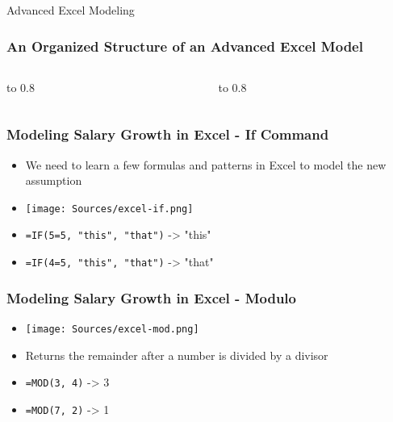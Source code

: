 \documentclass[handout, 11pt]{beamer}
\begin{document}
\begin{section}{Advanced Excel Modeling}
\begin{frame}
\frametitle{An Organized Structure of an Advanced Excel Model}
\begin{columns}
\begin{column}{0.5\textwidth}
\vbox to 0.8
\end{column}
\begin{column}{0.5\textwidth}
\vbox to 0.8
\end{column}
\end{columns}
\end{frame}
\begin{frame}
\frametitle{Modeling Salary Growth in Excel - If Command}
\begin{itemize}
\item We need to learn a few formulas and patterns in Excel to model the new assumption
\vfill
\item \texttt{[image: Sources/excel-if.png]}
\vfill
\item \texttt{=IF(5=5, "this", "that")}
-> "this"
\vfill
\item \texttt{=IF(4=5, "this", "that")}
-> "that"
\end{itemize}
\end{frame}
\begin{frame}
\frametitle{Modeling Salary Growth in Excel - Modulo}
\begin{itemize}
\item \texttt{[image: Sources/excel-mod.png]}
\vfill
\item Returns the remainder after a number is divided by a divisor
\vfill
\item \texttt{=MOD(3, 4)}
-> 3
\vfill
\item \texttt{=MOD(7, 2)}
-> 1
\end{itemize}
\end{frame}

\end{section}
\end{document}
